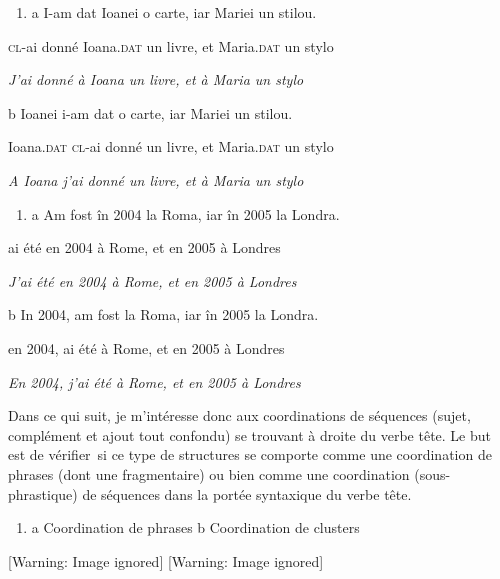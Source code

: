 \begin{enumerate}
\item \label{bkm:Ref302391672}a  I-am dat Ioanei o carte, iar Mariei un stilou.


\end{enumerate}
\textsc{cl}-ai donné Ioana\textsc{.dat} un livre, et Maria.\textsc{dat} un stylo

{\itshape
J'ai donné à Ioana un livre, et à Maria un stylo}

  b  Ioanei i-am dat o carte, iar Mariei un stilou.

    Ioana.\textsc{dat cl}-ai donné un livre, et Maria.\textsc{dat} un stylo

{\itshape
A Ioana j'ai donné un livre, et à Maria un stylo}


\begin{enumerate}
\item \label{bkm:Ref302391675}a  Am fost în 2004 la Roma, iar în 2005 la Londra.


\end{enumerate}
ai été en 2004 à Rome, et en 2005 à Londres

{\itshape
J'ai été en 2004 à Rome, et en 2005 à Londres}

  b  In 2004, am fost la Roma, iar în 2005 la Londra.

    en 2004, ai été à Rome, et en 2005 à Londres

\textit{En 2004, j'ai été à Rome, et en 2005 à Londres} 

Dans ce qui suit, je m'intéresse donc aux coordinations de séquences (sujet, complément et ajout tout confondu) se trouvant à droite du verbe tête. Le but est de vérifier~si ce type de structures se comporte comme une coordination de phrases (dont une fragmentaire) ou bien comme une coordination (sous-phrastique) de séquences dans la portée syntaxique du verbe tête. 


\begin{enumerate}
\item a  Coordination de phrases       b  Coordination de clusters 


\end{enumerate}
  [Warning: Image ignored] %
   [Warning: Image ignored] %
 

